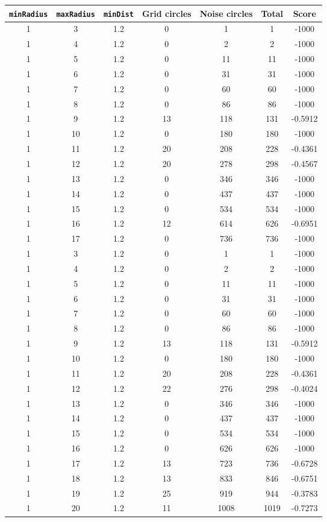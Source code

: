 \documentclass[letterpaper, 12pt]{article}
\begin{document}
\begin{longtable}{|c|c|c|c|c|c|c|}
\hline
\textbf{\texttt{minRadius}} & \textbf{\texttt{maxRadius}} & \textbf{\texttt{minDist}} & \textbf{Grid circles} & \textbf{Noise circles} & \textbf{Total} & \textbf{Score} \\
\hline
1 & 3 & 1.2 & 0 & 1 & 1 & -1000 \\
\hline
1 & 4 & 1.2 & 0 & 2 & 2 & -1000 \\
\hline
1 & 5 & 1.2 & 0 & 11 & 11 & -1000 \\
\hline
1 & 6 & 1.2 & 0 & 31 & 31 & -1000 \\
\hline
1 & 7 & 1.2 & 0 & 60 & 60 & -1000 \\
\hline
1 & 8 & 1.2 & 0 & 86 & 86 & -1000 \\
\hline
1 & 9 & 1.2 & 13 & 118 & 131 & -0.5912 \\
\hline
1 & 10 & 1.2 & 0 & 180 & 180 & -1000 \\
\hline
1 & 11 & 1.2 & 20 & 208 & 228 & -0.4361 \\
\hline
1 & 12 & 1.2 & 20 & 278 & 298 & -0.4567 \\
\hline
1 & 13 & 1.2 & 0 & 346 & 346 & -1000 \\
\hline
1 & 14 & 1.2 & 0 & 437 & 437 & -1000 \\
\hline
1 & 15 & 1.2 & 0 & 534 & 534 & -1000 \\
\hline
1 & 16 & 1.2 & 12 & 614 & 626 & -0.6951 \\
\hline
1 & 17 & 1.2 & 0 & 736 & 736 & -1000 \\
\hline
1 & 3 & 1.2 & 0 & 1 & 1 & -1000 \\
\hline
1 & 4 & 1.2 & 0 & 2 & 2 & -1000 \\
\hline
1 & 5 & 1.2 & 0 & 11 & 11 & -1000 \\
\hline
1 & 6 & 1.2 & 0 & 31 & 31 & -1000 \\
\hline
1 & 7 & 1.2 & 0 & 60 & 60 & -1000 \\
\hline
1 & 8 & 1.2 & 0 & 86 & 86 & -1000 \\
\hline
1 & 9 & 1.2 & 13 & 118 & 131 & -0.5912 \\
\hline
1 & 10 & 1.2 & 0 & 180 & 180 & -1000 \\
\hline
1 & 11 & 1.2 & 20 & 208 & 228 & -0.4361 \\
\hline
1 & 12 & 1.2 & 22 & 276 & 298 & -0.4024 \\
\hline
1 & 13 & 1.2 & 0 & 346 & 346 & -1000 \\
\hline
1 & 14 & 1.2 & 0 & 437 & 437 & -1000 \\
\hline
1 & 15 & 1.2 & 0 & 534 & 534 & -1000 \\
\hline
1 & 16 & 1.2 & 0 & 626 & 626 & -1000 \\
\hline
1 & 17 & 1.2 & 13 & 723 & 736 & -0.6728 \\
\hline
1 & 18 & 1.2 & 13 & 833 & 846 & -0.6751 \\
\hline
1 & 19 & 1.2 & 25 & 919 & 944 & -0.3783 \\
\hline
1 & 20 & 1.2 & 11 & 1008 & 1019 & -0.7273 \\
\hline
\end{longtable}
\end{document}
